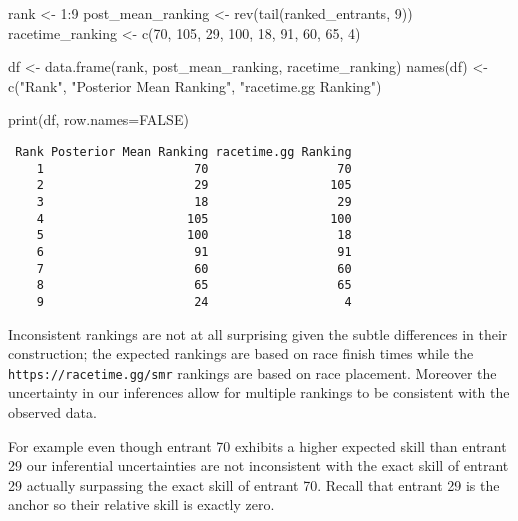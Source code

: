 \documentclass[
  letterpaper,
  DIV=11,
  numbers=noendperiod]{scrartcl}
\newenvironment{Shaded}{\begin{snugshade}}{\end{snugshade}}
\newcommand{\AttributeTok}[1]{\textcolor[rgb]{0.40,0.45,0.13}{#1}}
\newcommand{\ConstantTok}[1]{\textcolor[rgb]{0.56,0.35,0.01}{#1}}
\newcommand{\DecValTok}[1]{\textcolor[rgb]{0.68,0.00,0.00}{#1}}
\newcommand{\FunctionTok}[1]{\textcolor[rgb]{0.28,0.35,0.67}{#1}}
\newcommand{\NormalTok}[1]{\textcolor[rgb]{0.00,0.23,0.31}{#1}}
\newcommand{\OtherTok}[1]{\textcolor[rgb]{0.00,0.23,0.31}{#1}}
\newcommand{\SpecialCharTok}[1]{\textcolor[rgb]{0.37,0.37,0.37}{#1}}
\newcommand{\StringTok}[1]{\textcolor[rgb]{0.13,0.47,0.30}{#1}}
\begin{document}
\begin{Shaded}
\begin{Highlighting}[]
\NormalTok{rank }\OtherTok{\textless{}{-}} \DecValTok{1}\SpecialCharTok{:}\DecValTok{9}
\NormalTok{post\_mean\_ranking }\OtherTok{\textless{}{-}} \FunctionTok{rev}\NormalTok{(}\FunctionTok{tail}\NormalTok{(ranked\_entrants, }\DecValTok{9}\NormalTok{))}
\NormalTok{racetime\_ranking }\OtherTok{\textless{}{-}} \FunctionTok{c}\NormalTok{(}\DecValTok{70}\NormalTok{, }\DecValTok{105}\NormalTok{, }\DecValTok{29}\NormalTok{, }\DecValTok{100}\NormalTok{, }\DecValTok{18}\NormalTok{, }\DecValTok{91}\NormalTok{, }\DecValTok{60}\NormalTok{, }\DecValTok{65}\NormalTok{, }\DecValTok{4}\NormalTok{)}

\NormalTok{df }\OtherTok{\textless{}{-}} \FunctionTok{data.frame}\NormalTok{(rank, post\_mean\_ranking, racetime\_ranking)}
\FunctionTok{names}\NormalTok{(df) }\OtherTok{\textless{}{-}} \FunctionTok{c}\NormalTok{(}\StringTok{"Rank"}\NormalTok{, }\StringTok{"Posterior Mean Ranking"}\NormalTok{, }\StringTok{"racetime.gg Ranking"}\NormalTok{)}

\FunctionTok{print}\NormalTok{(df, }\AttributeTok{row.names=}\ConstantTok{FALSE}\NormalTok{)}
\end{Highlighting}
\end{Shaded}

\begin{verbatim}
 Rank Posterior Mean Ranking racetime.gg Ranking
    1                     70                  70
    2                     29                 105
    3                     18                  29
    4                    105                 100
    5                    100                  18
    6                     91                  91
    7                     60                  60
    8                     65                  65
    9                     24                   4
\end{verbatim}

Inconsistent rankings are not at all surprising given the subtle
differences in their construction; the expected rankings are based on
race finish times while the \texttt{https://racetime.gg/smr} rankings
are based on race placement. Moreover the uncertainty in our inferences
allow for multiple rankings to be consistent with the observed data.

For example even though entrant 70 exhibits a higher expected skill than
entrant 29 our inferential uncertainties are not inconsistent with the
exact skill of entrant 29 actually surpassing the exact skill of entrant
70. Recall that entrant 29 is the anchor so their relative skill is
exactly zero.
\end{document}
